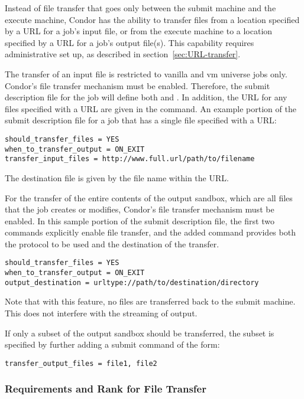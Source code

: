 Instead of file transfer that goes only between the submit machine
and the execute machine,
Condor has the ability to transfer files from a location specified
by a URL for a job's input file,
or from the execute machine to a location specified by a URL
for a job's output file(s).
This capability requires administrative set up, 
as described in section~\ref{sec:URL-transfer}.

The transfer of an input file is restricted to
vanilla and vm universe jobs only.
Condor's file transfer mechanism must be enabled.
Therefore, the submit description file for the job will define both
 and .
In addition, the URL for any files specified with a URL are
given in the  command.
An example portion of the submit description file for a job
that has a single file specified with a URL:

\footnotesize
\begin{verbatim}
should_transfer_files = YES
when_to_transfer_output = ON_EXIT
transfer_input_files = http://www.full.url/path/to/filename
\end{verbatim}
\normalsize

The destination file is given by the file name within the URL. 

For the transfer of the entire contents of the output sandbox,
which are all files that the job creates or modifies,
Condor's file transfer mechanism must be enabled.
In this sample portion of the submit description file,
the first two commands explicitly enable file transfer,
and the added  command provides
both the protocol to be used and the destination of the transfer.
\footnotesize
\begin{verbatim}
should_transfer_files = YES
when_to_transfer_output = ON_EXIT
output_destination = urltype://path/to/destination/directory
\end{verbatim}
\normalsize
Note that with this feature, no files are transferred back to the 
submit machine.  
This does not interfere with the streaming of output. 

If only a subset of the output sandbox should be transferred,
the subset is specified by further adding a submit command of the form:
\footnotesize
\begin{verbatim}
transfer_output_files = file1, file2
\end{verbatim}
\normalsize

\subsubsection{Requirements and Rank for File Transfer}

